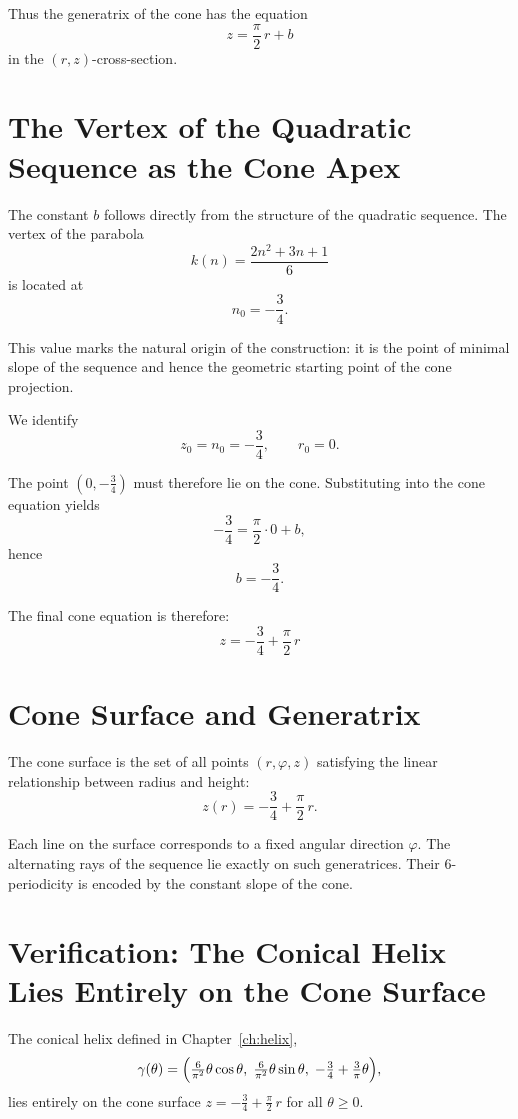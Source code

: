 Thus the generatrix of the cone has the equation
\[
z = \frac{\pi}{2}\,r + b
\]
in the $(r,z)$-cross-section.

\section{The Vertex of the Quadratic Sequence as the Cone Apex}

The constant $b$ follows directly from the structure of the quadratic
sequence. The vertex of the parabola
\[
k(n) = \frac{2n^2 + 3n + 1}{6}
\]
is located at
\[
n_0 = -\frac{3}{4}.
\]

This value marks the natural origin of the construction: it is the point of
minimal slope of the sequence and hence the geometric starting point of the
cone projection.

We identify
\[
z_0 = n_0 = -\frac{3}{4}, \qquad r_0 = 0.
\]

The point $(0,-\tfrac{3}{4})$ must therefore lie on the cone. Substituting
into the cone equation yields
\[
-\frac{3}{4} = \frac{\pi}{2}\cdot 0 + b,
\]
hence
\[
b = -\frac{3}{4}.
\]

The final cone equation is therefore:
\[
\boxed{
z = -\frac{3}{4} + \frac{\pi}{2}\,r
}
\]

\section{Cone Surface and Generatrix}

The cone surface is the set of all points $(r,\varphi,z)$ satisfying the
linear relationship between radius and height:
\[
z(r) = -\frac{3}{4} + \frac{\pi}{2}\,r.
\]

Each line on the surface corresponds to a fixed angular direction $\varphi$.
The alternating rays of the sequence lie exactly on such generatrices.
Their 6-periodicity is encoded by the constant slope of the cone.

\section{Verification: The Conical Helix Lies Entirely on the Cone Surface}

\begin{theorem}\label{thm:helix-on-cone}
The conical helix defined in Chapter~\ref{ch:helix},
\[
\gamma(\theta)
= \Bigl(\tfrac{6}{\pi^2}\theta\cos\theta,\;
        \tfrac{6}{\pi^2}\theta\sin\theta,\;
        -\tfrac{3}{4}+\tfrac{3}{\pi}\theta\Bigr),
\]
lies entirely on the cone surface
$z = -\tfrac{3}{4} + \tfrac{\pi}{2}\,r$ for all $\theta \geq 0$.
\end{theorem}

